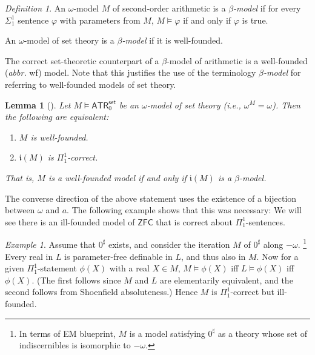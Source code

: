 \documentclass{amsart}
\newtheorem{lemma}[theorem]{Lemma}
\theoremstyle{remark}
\newtheorem{definition}[definition]{Definition}
\newtheorem{example}[example]{Example}
\newcommand{\fraki}{\mathfrak{i}}
\newcommand{\ATR}{\mathsf{ATR}}
\newcommand{\set}{\mathsf{set}}
\begin{document}
\begin{definition}
    An $\omega$-model $M$ of second-order arithmetic is a \emph{$\beta$-model} if for every $\Sigma^1_1$ sentence $\varphi$ with parameters from $M$, $M\vDash\varphi$ if and only if $\varphi$ is true.

    An $\omega$-model of set theory is a \emph{$\beta$-model} if it is well-founded.
\end{definition}
The correct set-theoretic counterpart of a $\beta$-model of arithmetic is a well-founded (\emph{abbr.} wf) model. Note that this justifies the use of the terminology \emph{$\beta$-model} for referring to well-founded models of set theory.
\begin{lemma}[{\cite[Theorem VII.3.27]{simpson2009subsystems}}] \label{Lemma: Two beta model notions are equal} \pushQED{\qed}
    Let $M\vDash \ATR_0^\set$ be an $\omega$-model of set theory (i.e., $\omega^M=\omega$). Then the following are equivalent:
    \begin{enumerate}
        \item $M$ is well-founded.
        \item $\fraki(M)$ is $\Pi^1_1$-correct.
    \end{enumerate}
    That is, $M$ is a well-founded model if and only if $\fraki(M)$ is a $\beta$-model. \qedhere
\end{lemma}

The converse direction of the above statement uses the existence of a bijection between $\omega$ and $a$. The following example shows that this was necessary: We will see there is an ill-founded model of $\mathsf{ZFC}$ that is correct about $\Pi^1_1$-sentences.

\begin{example}
    Assume that $0^\sharp$ exists, and consider the iteration $M$ of $0^\sharp$ along $-\omega$.%
    \footnote{In terms of EM blueprint, $M$ is a model satisfying $0^\sharp$ as a theory whose set of indiscernibles is isomorphic to $-\omega$.}
    Every real in $L$ is parameter-free definable in $L$, and thus also in $M$.
    Now for a given $\Pi^1_1$-statement $\phi(X)$ with a real $X\in M$, $M\vDash \phi(X)$ iff $L\vDash \phi(X)$ iff $\phi(X)$. (The first follows since $M$ and $L$ are elementarily equivalent, and the second follows from Shoenfield absoluteness.) Hence $M$ is $\Pi^1_1$-correct but ill-founded.
\end{example}
\end{document}
